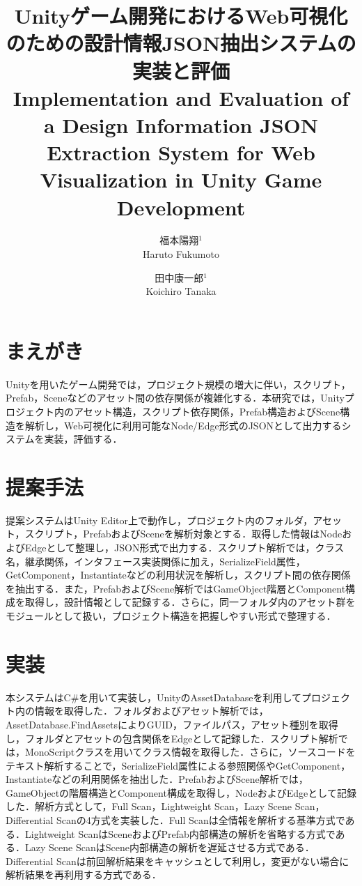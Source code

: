 \documentclass[twocolumn,a4paper,dvipdfmx]{ieicejsp}
\title{{\bf Unityゲーム開発におけるWeb可視化のための設計情報JSON抽出システムの実装と評価}
  {\normalsize \\Implementation and Evaluation of a Design Information JSON Extraction System for Web Visualization in Unity Game Development}}
\author{
    福本陽翔$^1$ \\ Haruto Fukumoto\and
    田中康一郎$^1$ \\ Koichiro Tanaka\\
  }
\begin{document}
\maketitle
\section{まえがき}

Unityを用いたゲーム開発では，プロジェクト規模の増大に伴い，スクリプト，Prefab，Sceneなどのアセット間の依存関係が複雑化する．本研究では，Unityプロジェクト内のアセット構造，スクリプト依存関係，Prefab構造およびScene構造を解析し，Web可視化に利用可能なNode/Edge形式のJSONとして出力するシステムを実装，評価する．

\section{提案手法}

提案システムはUnity Editor上で動作し，プロジェクト内のフォルダ，アセット，スクリプト，PrefabおよびSceneを解析対象とする．取得した情報はNodeおよびEdgeとして整理し，JSON形式で出力する．スクリプト解析では，クラス名，継承関係，インタフェース実装関係に加え，SerializeField属性，GetComponent，Instantiateなどの利用状況を解析し，スクリプト間の依存関係を抽出する．また，PrefabおよびScene解析ではGameObject階層とComponent構成を取得し，設計情報として記録する．さらに，同一フォルダ内のアセット群をモジュールとして扱い，プロジェクト構造を把握しやすい形式で整理する．

\section{実装}

本システムはC\#を用いて実装し，UnityのAssetDatabaseを利用してプロジェクト内の情報を取得した\cite{unity_assetdatabase}．フォルダおよびアセット解析では，AssetDatabase.FindAssetsによりGUID，ファイルパス，アセット種別を取得し，フォルダとアセットの包含関係をEdgeとして記録した．スクリプト解析では，MonoScriptクラスを用いてクラス情報を取得した\cite{unity_monoscript}．さらに，ソースコードをテキスト解析することで，SerializeField属性による参照関係やGetComponent，Instantiateなどの利用関係を抽出した．PrefabおよびScene解析では，GameObjectの階層構造とComponent構成を取得し，NodeおよびEdgeとして記録した．解析方式として，Full Scan，Lightweight Scan，Lazy Scene Scan，Differential Scanの4方式を実装した．Full Scanは全情報を解析する基準方式である．Lightweight ScanはSceneおよびPrefab内部構造の解析を省略する方式である．Lazy Scene ScanはScene内部構造の解析を遅延させる方式である．Differential Scanは前回解析結果をキャッシュとして利用し，変更がない場合に解析結果を再利用する方式である．
\end{document}

